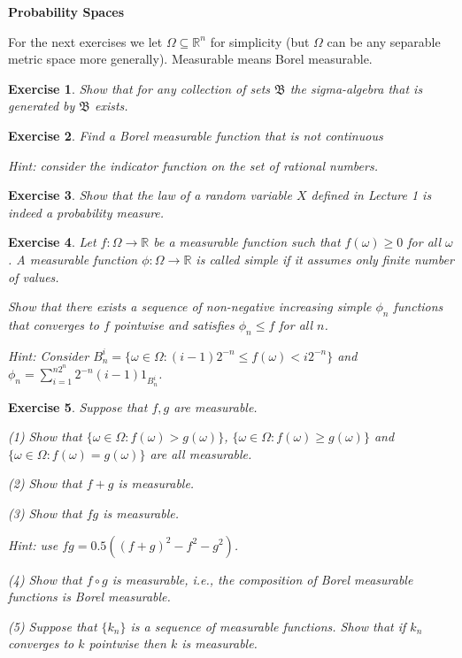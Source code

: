 \documentclass[letter,11pt]{article}
\newtheorem{exercise}{Exercise}[section]
\begin{document}
\textbf{Probability Spaces}

For the next exercises we let $\Omega \subseteq \mathbb{R}^{n}$ for simplicity (but $\Omega$ can be any separable metric space more generally). Measurable means Borel measurable. 


 \begin{exercise} Show that for any collection of sets $\mathfrak{B}$ the sigma-algebra that is generated by  $\mathfrak{B}$ exists. 
 \end{exercise}





   \begin{exercise} 
 Find a Borel measurable function that is not continuous 
 
 Hint: consider the indicator function on the set of rational numbers. 
 \end{exercise}



\begin{exercise}
Show that the law of a random variable $X$ defined in Lecture 1 is indeed a probability measure. 
\end{exercise}


\begin{exercise}
    Let $f:\Omega \rightarrow \mathbb{R}$ be a measurable function such that $f(\omega) \geq 0$ for all $\omega$. A measurable function $\phi : \Omega \rightarrow \mathbb{R}$ is called simple if it assumes only finite number of values. 

Show that there exists a sequence of non-negative increasing simple $\phi_{n}$ functions that converges to $f$ pointwise and satisfies $\phi _{n} \leq f$ for all $n$.


Hint: Consider $B_{n}^{i} = \{ \omega \in \Omega: (i-1)2^{-n} \leq f(\omega) < i2^{-n} \} $ and $\phi _{n} = \sum _{i=1}^{n2^n} 2^{-n}(i-1) 1_{B_{n}^{i} } $. 

\end{exercise}




\begin{exercise} 
Suppose that $f,g$ are measurable. 

(1) Show that $ \{ \omega \in \Omega: f(\omega) > g(\omega) \}$, $ \{ \omega \in \Omega: f(\omega) \geq g(\omega) \}$ and $\{ \omega \in \Omega: f(\omega) = g(\omega) \}$ are all measurable. 

(2) Show that $f + g$ is measurable. 

(3) Show that $fg$ is measurable.

Hint: use  $fg = 0.5 ( (f+g)^2 - f^2 - g^2)$.

(4) Show that $f \circ g$ is measurable, i.e.,  the composition of Borel measurable functions is Borel measurable. 

(5)  Suppose that $\{k_{n} \}$ is a sequence of measurable functions. Show that if $k_{n}$ converges to $k$ pointwise then $k$ is measurable. 
\end{exercise}
\end{document}
